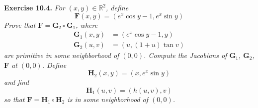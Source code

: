 \documentclass{article}
\begin{document}



\textbf{Exercise 10.4.}
\emph{For $(x,y) \in \mathbb{R}^2$, define
\[
  \mathbf{F}(x,y) = (e^x \cos y - 1, e^x \sin y)
\]
Prove that $\mathbf{F} = \mathbf{G}_2 \circ \mathbf{G}_1$, where
\begin{align*}
  \mathbf{G}_1(x,y) &= (e^x \cos y - 1, y) \\
  \mathbf{G}_2(u,v) &= (u, (1+u) \tan v)
\end{align*}
are primitive in some neighborhood of $(0,0)$.
Compute the Jacobians of $\mathbf{G}_1$, $\mathbf{G}_2$, $\mathbf{F}$ at $(0,0)$.
Define
\[
  \mathbf{H}_2(x,y) = (x, e^x \sin y)
\]
and find
\[
  \mathbf{H}_1(u,v) = (h(u,v),v)
\]
so that $\mathbf{F} = \mathbf{H}_1 \circ \mathbf{H}_2$
is in some neighborhood of $(0,0)$.} \\
\end{document}
